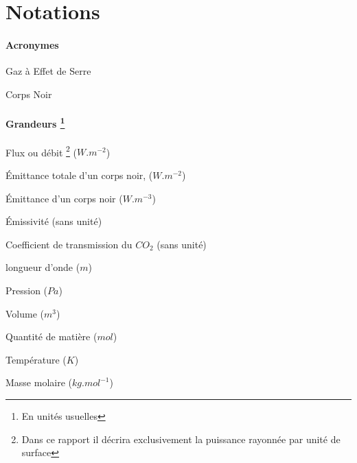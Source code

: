 \documentclass[a4paper, 12pt]{report} %
\begin{document}
\vfill


\newpage
\pagestyle{courant} 
	\setcounter{tocdepth}{2} %
	\tableofcontents %


\newpage
\chapter*{Notations} 

\begin{description}
	\subsubsection*{Acronymes}
	\item[GES:] Gaz à Effet de Serre
    \item[CN:] Corps Noir
    
	\subsubsection*{Grandeurs \footnote{En unités usuelles}}
    \item[\boldmath{$\Phi$}:] Flux ou débit \footnote{Dans ce rapport 
	il décrira exclusivement la puissance rayonnée par unité de surface} ($W.m^{-2}$)
    \item[\boldmath{$M^{0}$}:] Émittance totale d'un corps noir, ($W.m^{-2}$)
    \item[\boldmath{$M^{0}_{\lambda,T}$}:] Émittance d'un corps noir ($W.m^{-3}$)
    \item[\boldmath{$\epsilon$}:] Émissivité (sans unité)
    \item[\boldmath{$\tau_{CO_2}$}:] Coefficient de transmission du $CO_2$ (sans unité)
    \item[\boldmath{$\lambda$}:] longueur d'onde ($m$)
    \item[\boldmath{$P$}:] Pression ($Pa$)
    \item[\boldmath{$V$}:] Volume ($m^3$)
	\item[\boldmath{$n$}:] Quantité de matière ($mol$)
	\item[\boldmath{$T$}:] Température ($K$)
 	\item[\boldmath{$M$}:] Masse molaire ($kg.mol^{-1}$)
	

\end{description}
\end{document}
